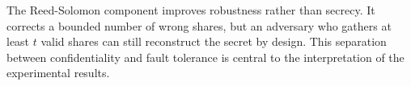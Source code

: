 The Reed-Solomon component improves robustness rather than secrecy. It corrects a bounded number of wrong shares, but an adversary who gathers at least $t$ valid shares can still reconstruct the secret by design. This separation between confidentiality and fault tolerance is central to the interpretation of the experimental results.
